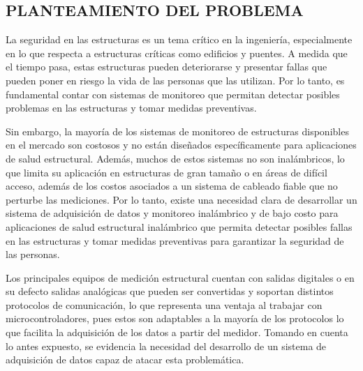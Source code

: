 \documentclass[12pt,letterpaper]{article}
\begin{document}
\newpage


		
\begin{center}
		\section*{ PLANTEAMIENTO DEL PROBLEMA}

\end{center}


\vspace{0.3cm}

La seguridad en las estructuras es un tema crítico en la ingeniería, especialmente en lo que respecta a estructuras críticas como edificios y puentes. A medida que el tiempo pasa, estas estructuras pueden deteriorarse y presentar fallas que pueden poner en riesgo la vida de las personas que las utilizan. Por lo tanto, es fundamental contar con sistemas de monitoreo que permitan detectar posibles problemas en las estructuras y tomar medidas preventivas.

Sin embargo, la mayoría de los sistemas de monitoreo de estructuras disponibles en el mercado son costosos y no están diseñados específicamente para aplicaciones de salud estructural. Además, muchos de estos sistemas no son inalámbricos, lo que limita su aplicación en estructuras de gran tamaño o en áreas de difícil acceso, además de los costos asociados a un sistema de cableado fiable que no perturbe las mediciones.  Por lo tanto, existe una necesidad clara de desarrollar un sistema de adquisición de datos y monitoreo inalámbrico y de bajo costo para aplicaciones de salud estructural inalámbrico que permita detectar posibles fallas en las estructuras y tomar medidas preventivas para garantizar la seguridad de las personas.

Los principales equipos de medición estructural cuentan con salidas digitales o en su defecto salidas analógicas que pueden ser convertidas y soportan distintos protocolos de comunicación, lo que representa una ventaja al trabajar con microcontroladores, pues estos son adaptables a la mayoría de los protocolos lo que facilita la adquisición de los datos a partir del medidor. Tomando en cuenta lo antes expuesto, se evidencia la necesidad del desarrollo de un sistema de adquisición de datos capaz de atacar esta problemática.

\end{document}
